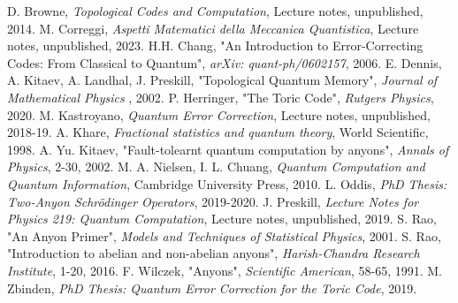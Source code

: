 \documentclass{Configuration_Files/PoliMi3i_thesis}
\begin{document}
\begin{thebibliography}{99} %
	 D. Browne, {\it Topological Codes and Computation}, Lecture notes, unpublished, 2014.
	 M. Correggi, \textit{Aspetti Matematici della Meccanica Quantistica}, Lecture notes, unpublished, 2023.
	 H.H. Chang, "An Introduction to Error-Correcting Codes: From Classical to Quantum", {\it arXiv: quant-ph/0602157}, 2006.
	 E. Dennis, A. Kitaev, A. Landhal, J. Preskill, "Topological Quantum Memory", {\it Journal of Mathematical Physics }, 2002.
	 P. Herringer, "The Toric Code", {\it Rutgers Physics}, 2020.
	 M. Kastroyano, {\it Quantum Error Correction}, Lecture notes, unpublished, 2018-19.
	 A. Khare, {\it Fractional statistics and quantum theory}, World Scientific, 1998.
	 A. Yu. Kitaev, "Fault-tolearnt quantum computation by anyons", {\it Annals of Physics}, 2-30, 2002.
	 M. A. Nielsen, I. L. Chuang, {\it Quantum Computation and Quantum Information}, Cambridge University Press, 2010.
	 L. Oddis, {\it PhD Thesis: Two-Anyon Schrödinger Operators}, 2019-2020.
	 J. Preskill, {\it Lecture Notes for Physics 219:
		Quantum Computation}, Lecture notes, unpublished, 2019.
	 S. Rao, "An Anyon Primer", {\it Models and Techniques of Statistical Physics}, 2001.
	 S. Rao, "Introduction to abelian and non-abelian anyons", {\it Harish-Chandra Research Institute}, 1-20, {2016}.
	 F. Wilczek, "Anyons", {\it Scientific American}, 58-65, 1991.
	 M. Zbinden, {\it PhD Thesis: Quantum Error Correction for the Toric Code}, 2019.

\end{thebibliography}



\cleardoublepage
{} %
\end{document}
